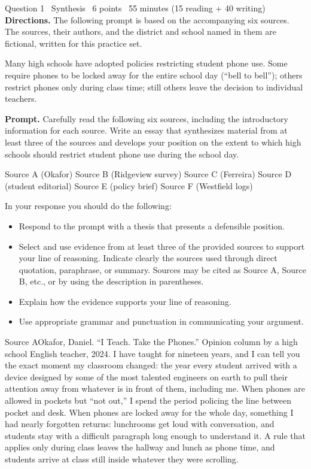 \documentclass[11pt]{article}
\begin{document}
\begin{frq}{Question 1 \textperiodcentered\ Synthesis \textperiodcentered\ 6 points \textperiodcentered\ 55 minutes (15 reading + 40 writing)}
\small
\textbf{Directions.} The following prompt is based on the accompanying six sources. The sources, their authors, and the district and school named in them are fictional, written for this practice set.

Many high schools have adopted policies restricting student phone use. Some require phones to be locked away for the entire school day (``bell to bell''); others restrict phones only during class time; still others leave the decision to individual teachers.

\textbf{Prompt.} Carefully read the following six sources, including the introductory information for each source. Write an essay that synthesizes material from at least three of the sources and develops your position on the extent to which high schools should restrict student phone use during the school day.

Source A (Okafor) \quad Source B (Ridgeview survey) \quad Source C (Ferreira) \quad Source D (student editorial) \quad Source E (policy brief) \quad Source F (Westfield logs)

In your response you should do the following:
\begin{itemize}[leftmargin=1.5em,itemsep=1pt]
\item Respond to the prompt with a thesis that presents a defensible position.
\item Select and use evidence from at least three of the provided sources to support your line of reasoning. Indicate clearly the sources used through direct quotation, paraphrase, or summary. Sources may be cited as Source A, Source B, etc., or by using the description in parentheses.
\item Explain how the evidence supports your line of reasoning.
\item Use appropriate grammar and punctuation in communicating your argument.
\end{itemize}
\end{frq}

\begin{source}{Source A}{Okafor, Daniel. ``I Teach. Take the Phones.'' Opinion column by a high school English teacher, 2024.}
I have taught for nineteen years, and I can tell you the exact moment my classroom changed: the year every student arrived with a device designed by some of the most talented engineers on earth to pull their attention away from whatever is in front of them, including me. When phones are allowed in pockets but ``not out,'' I spend the period policing the line between pocket and desk. When phones are locked away for the whole day, something I had nearly forgotten returns: lunchrooms get loud with conversation, and students stay with a difficult paragraph long enough to understand it. A rule that applies only during class leaves the hallway and lunch as phone time, and students arrive at class still inside whatever they were scrolling.
\end{source}
\end{document}
